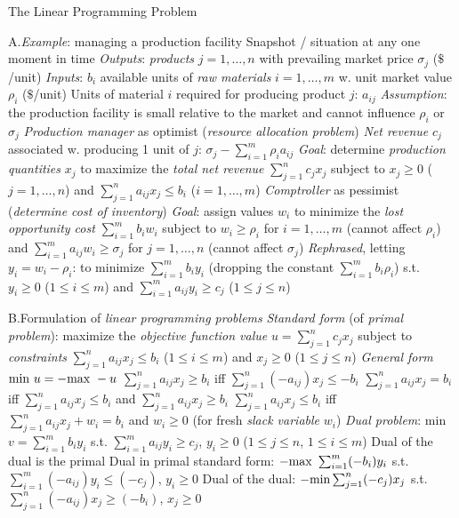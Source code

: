 \beginsection The Linear Programming Problem

\item{A.}\emph{Example}: managing a production facility\smallskip
{}Snapshot / situation at any one moment in time\smallskip
{}\emph{Outputs}: \emph{products} $j=1,\ldots,n$ with prevailing
market price $\sigma_j$ ($\$$/unit) \smallskip
{}\emph{Inputs}: $b_i$ available units of \emph{raw materials} $i=1,
\ldots,m$ w. unit market value $\rho_i$ ($\$$/unit)\smallskip
{}Units of material $i$ required for producing product $j$: $a_{ij}$
\smallskip
{}\emph{Assumption}: the production facility is small relative to the
market and cannot influence $\rho_i$ or $\sigma_j$\smallskip
{}\emph{Production manager} as optimist (\emph{resource allocation
problem})\smallskip
{}\emph{Net revenue} $c_j$ associated w. producing 1 unit of $j$:
$\sigma_j-\sum_{i=1}^m\rho_ia_{ij}$\smallskip
{}\emph{Goal}: determine \emph{production quantities} $x_j$ to
maximize the \emph{total net revenue} $\sum_{j=1}^nc_jx_j$ subject to
$x_j\geq 0$ ($j=1,\ldots,n$) and $\sum_{j=1}^na_{ij}x_j\leq b_i$ ($i=1,\ldots,
m$)\smallskip
{}\emph{Comptroller} as pessimist (\emph{determine cost of inventory})
\smallskip
{}\emph{Goal}: assign values $w_i$ to minimize the \emph{lost
opportunity cost} $\sum_{i=1}^mb_iw_i$ subject to $w_i\geq\rho_i$ for $i=1,
\ldots,m$ (cannot affect $\rho_i$) and $\sum_{i=1}^ma_{ij}w_i\geq\sigma_j$ for
$j=1,\ldots,n$ (cannot affect $\sigma_j$)\smallskip
{}\emph{Rephrased}, letting $y_i=w_i-\rho_i$: to minimize 
$\sum_{i=1}^mb_iy_i$ (dropping the constant $\sum_{i=1}^mb_i\rho_i$) s.t.
$y_i\geq 0$ ($1\leq i\leq m$) and $\sum_{i=1}^ma_{ij}y_i\geq c_j$ ($1\leq j\leq
n$)\smallskip

\item{B.}Formulation of \emph{linear programming problems}\smallskip
{}\emph{Standard form} (of \emph{primal problem}): maximize
the \emph{objective function value} $u=\sum_{j=1}^nc_{j}x_j$ subject to
\emph{constraints} $\sum_{j=1}^na_{ij}x_j\leq b_i$
($1\leq i\leq m$) and $x_j\geq 0$ ($1\leq j\leq n$)\smallskip
{}\emph{General form}\smallskip
{}${\rm min}\ u=-{\rm max}\ -u$\smallskip
{}$\sum_{j=1}^na_{ij}x_j\geq b_i$ iff $\sum_{j=1}^n(-a_{ij})x_j\leq
-b_i$\smallskip
{}$\sum_{j=1}^na_{ij}x_j=b_i$ iff $\sum_{j=1}^na_{ij}x_j\leq b_i$ and
$\sum_{j=1}^na_{ij}x_j\geq b_i$\smallskip
{}$\sum_{j=1}^na_{ij}x_j\leq b_i$ iff $\sum_{j=1}^na_{ij}x_j+w_i=b_i$
and $w_i\geq 0$ (for fresh \emph{slack variable} $w_i$)\smallskip
{}\emph{Dual problem}: min $v=\sum_{i=1}^mb_iy_i$
s.t. $\sum_{i=1}^ma_{ij}y_i\geq c_j$, $y_i\geq 0$ ($1\leq j\leq n$, $1\leq i
\leq m$)\smallskip
{}Dual of the dual is the primal\smallskip
{}Dual in primal standard form: $-{\rm max}\ \sum_{i=1}^m(-b_i)y_i$
s.t. $\sum_{i=1}^m(-a_{ij})y_i\leq(-c_j)$, $y_i\geq 0$\smallskip
{}Dual of the dual: $-{\rm min}\sum_{j=1}^n(-c_j)x_j$ s.t.
$\sum_{j=1}^n(-a_{ij})x_j\geq(-b_i)$, $x_j\geq 0$\smallskip

